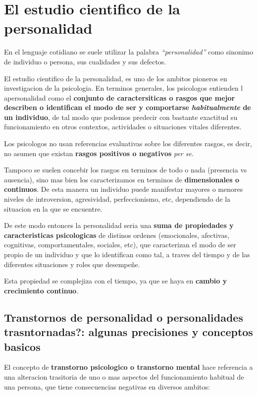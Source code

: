 \documentclass[12pt,a4paper]{article}
\begin{document}
\section{El estudio cientifico de la personalidad}

En el lenguaje cotidiano se suele utilizar la palabra \textit{\enquote{personalidad}} como sinonimo de individuo o persona, sus cualidades y sus defectos. 

El estudio cientifico de la personalidad, es uno de los ambitos pioneros en investigacion de la psicologia. En terminos generales, los psicologos entienden l apersonalidad como el \textbf{conjunto de caractersiticas o rasgos que mejor describen o identifican el modo de ser y comportarse \textit{habitualmente} de un individuo}, de tal modo que podemos predecir con bastante exactitud su funcionamiento en otros contextos, actividades o situaciones vitales diferentes. 

Los psicologos no usan referencias evaluativas sobre los diferentes rasgos, es decir, no asumen que existan \textbf{rasgos positivos o negativos} \textit{per se}.

Tampoco se suelen concebir los rasgos en terminos de todo o nada (presencia vs ausencia), sino mas bien los caracterizamos en terminos de \textbf{dimensionales o continuos}. De esta manera un individuo puede manifestar mayores o menores niveles de introversion, agresividad, perfeccionismo, etc, dependiendo de la situacion en la que se encuentre. 

De este modo entonces la personalidad seria una \textbf{suma de propiedades y caracteristicas psicologicas} de distinos ordenes (emocionales, afectivas, cognitivas, comportamentales, sociales, etc), que caracterizan el modo de ser propio de un individuo y que lo identifican como tal, a traves del tiempo y de las diferentes situaciones y roles que desempeñe.

Esta propiedad se complejiza con el tiempo, ya que se haya en \textbf{cambio y crecimiento continuo}.

\subsection{Transtornos de personalidad o personalidades trasntornadas?: algunas precisiones y conceptos basicos}

El concepto de \textbf{transtorno psicologico o transtorno mental} hace referencia a una alteracion trasitoria de uno o mas aspectos del funcionamiento habitual de una persona, que tiene consecuencias negativas en diversos ambitos:
\end{document}
